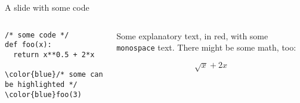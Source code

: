 \begin{frame}[fragile]{A slide with some code}

	\begin{columns}
		\begin{column}{0.5\linewidth}
			\footnotesize
			\begin{Verbatim}[commandchars=\\\{\}]
/* some code */
def foo(x):
  return x**0.5 + 2*x

\color{blue}/* some can be highlighted */
\color{blue}foo(3)
      \end{Verbatim}
    \end{column}
    \begin{column}{0.5\linewidth}
      {\color{red} Some explanatory text, in red, with some \texttt{monospace} text.}
      There might be some math, too:

      $$\sqrt{x} + 2x$$
    \end{column}
  \end{columns}

\end{frame}
